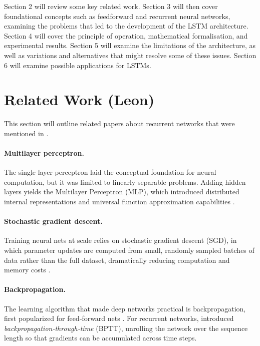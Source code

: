 \documentclass[twoside,a4paper,10pt,DIV=12,BCOR=12mm]{scrartcl}
\begin{document}
Section 2 will review some key related work. Section 3 will then cover foundational concepts such as feedforward and recurrent neural networks, examining the problems that led to the development of the LSTM architecture. Section 4 will cover the principle of operation, mathematical formalisation, and experimental results.  Section 5 will examine the limitations of the architecture, as well as variations and alternatives that might resolve some of these issues. Section 6 will examine possible applications for LSTMs.\\

\section{Related Work (Leon)}

This section will outline related papers about recurrent networks that were mentioned in \cite{hochreiter1997lstm}.


\paragraph{Multilayer perceptron.} The single‐layer perceptron \cite{Rosenblatt58} laid the conceptual 
foundation for neural computation, but it was limited to linearly separable problems. Adding hidden layers yields the
Multilayer Perceptron (MLP), which introduced distributed internal representations and universal function approximation capabilities \cite{Hornik89}.

\paragraph{Stochastic gradient descent.} Training neural nets at scale relies on stochastic gradient descent (SGD), in which 
parameter updates are computed from small, randomly sampled batches of data rather than the full dataset, dramatically reducing computation and memory costs \cite{Bottou10}.

\paragraph{Backpropagation.}
 The learning algorithm that made deep networks practical is backpropagation, first popularized for 
 feed‑forward nets \cite{Rumelhart86}.  For recurrent networks, 
 \cite{werb1990bptt} introduced \emph{backpropagation‑through‑time} (BPTT), unrolling the 
 network over the sequence length so that gradients can be accumulated across time steps.
\end{document}
